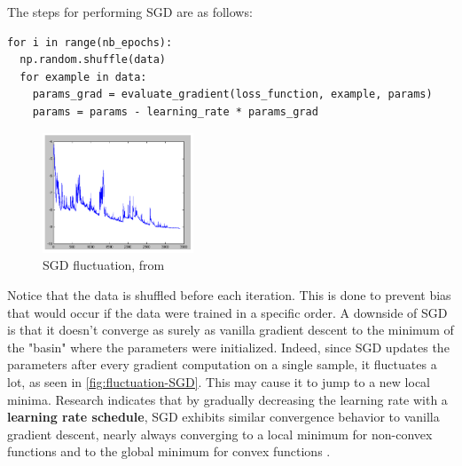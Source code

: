 \documentclass{article}
\begin{document}
   The steps for performing SGD are as follows:
\begin{verbatim}
for i in range(nb_epochs): 
  np.random.shuffle(data) 
  for example in data:
    params_grad = evaluate_gradient(loss_function, example, params) 
    params = params - learning_rate * params_grad
\end{verbatim}
\begin{figure} %
    \centering
    \includegraphics[width=0.4\textwidth]{fluctuation-SGD}
    \caption{SGD fluctuation, from \citep{ruder2017overview}}
    \label{fig:fluctuation-SGD}
\end{figure}
Notice that the data is shuffled before each iteration. This is done to prevent bias that would occur if the data were trained in a specific order. A downside of SGD is that it doesn't converge as surely as vanilla gradient descent to the minimum of the "basin" where the parameters were initialized. Indeed, since SGD updates the parameters after every gradient computation on a single sample, it fluctuates a lot, as seen in \autoref{fig:fluctuation-SGD}. This may cause it to jump to a new local minima. Research indicates that by gradually decreasing the learning rate with a \textbf{learning rate schedule}, SGD exhibits similar convergence behavior to vanilla gradient descent, nearly always converging to a local minimum for non-convex functions and to the global minimum for convex functions \citep{ruder2017overview}.
\end{document}
